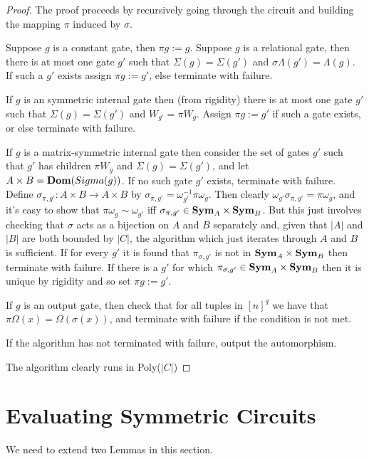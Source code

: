 \documentclass[12pt]{report}
\newcommand{\sym}{\text{\textbf{Sym}}}
\newcommand{\dom}{\text{\textbf{Dom}}}
\begin{document}
  \begin{proof}
    The proof proceeds by recursively going through the circuit and building the
    mapping $\pi$ induced by $\sigma$.

    Suppose $g$ is a constant gate, then $\pi g := g$. Suppose $g$ is a
    relational gate, then there is at most one gate $g'$ such that $\Sigma (g) =
    \Sigma (g')$ and $\sigma\Lambda (g') = \Lambda (g)$. If such a $g'$ exists
    assign $\pi g := g'$, else terminate with failure.

    If $g$ is an symmetric internal gate then (from rigidity) there is at most
    one gate $g'$ such that $\Sigma (g) = \Sigma(g')$ and $W_{g'} = \pi W_g$.
    Assign $\pi g := g'$ if such a gate exists, or else terminate with failure.

    If $g$ is a matrix-symmetric internal gate then consider the set of gates
    $g'$ such that $g'$ has children $\pi W_g$ and $\Sigma(g) = \Sigma(g')$, and
    let $A \times B = \dom (Sigma(g))$. If no such gate $g'$ exists, terminate
    with failure. Define $\sigma_{\pi, g'}:A \times B \rightarrow A \times B$ by
    $\sigma_{\pi, g'} = \omega^{-1}_{g'} \pi \omega_{g}$. Then clearly
    $\omega_{g'} \sigma_{\pi, g'} = \pi \omega_{g}$, and it's easy to show that
    $\pi \omega_g \sim \omega_{g'}$ iff $\sigma_{\pi,g'} \in \sym_A \times
    \sym_B$. But this just involves checking that $\sigma$ acts as a bijection
    on $A$ and $B$ separately and, given that $\vert A \vert$ and $\vert B
    \vert$ are both bounded by $\vert C \vert$, the algorithm which just
    iterates through $A$ and $B$ is sufficient. If for every $g'$ it is found
    that $\pi_{\sigma,g'}$ is not in $\sym_A \times \sym_B$ then terminate with
    failure. If there is a $g'$ for which $\pi_{\sigma, g'} \in \sym_A \times
    \sym_B$ then it is unique by rigidity and so set $\pi g := g'$.

    If $g$ is an output gate, then check that for all tuples in $[n]^{q}$ we
    have that $\pi \Omega (x) = \Omega (\sigma (x))$, and terminate with failure
    if the condition is not met.

    If the algorithm has not terminated with failure, output the automorphism.

    The algorithm clearly runs in Poly($\vert C \vert$)
  \end{proof}

  \section{Evaluating Symmetric Circuits}
  We need to extend two Lemmas in this section.
\end{document}
